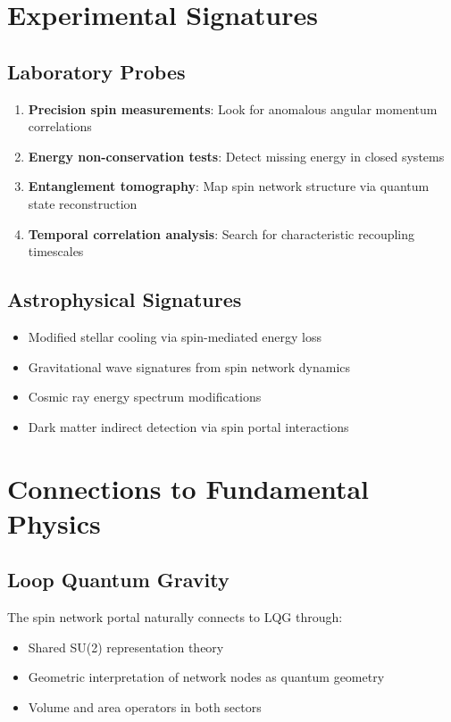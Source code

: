 \documentclass{article}
\begin{document}
\section{Experimental Signatures}

\subsection{Laboratory Probes}

\begin{enumerate}
\item \textbf{Precision spin measurements}: Look for anomalous angular momentum correlations
\item \textbf{Energy non-conservation tests}: Detect missing energy in closed systems
\item \textbf{Entanglement tomography}: Map spin network structure via quantum state reconstruction
\item \textbf{Temporal correlation analysis}: Search for characteristic recoupling timescales
\end{enumerate}

\subsection{Astrophysical Signatures}

\begin{itemize}
\item Modified stellar cooling via spin-mediated energy loss
\item Gravitational wave signatures from spin network dynamics
\item Cosmic ray energy spectrum modifications
\item Dark matter indirect detection via spin portal interactions
\end{itemize}

\section{Connections to Fundamental Physics}

\subsection{Loop Quantum Gravity}

The spin network portal naturally connects to LQG through:
\begin{itemize}
\item Shared SU(2) representation theory
\item Geometric interpretation of network nodes as quantum geometry
\item Volume and area operators in both sectors
\end{itemize}
\end{document}
